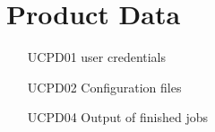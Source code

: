 \section{Product Data}
\begin{itemize}
  \item [UCPD01] user credentials
  \item [UCPD02] Configuration files
  \item [UCPD04] Output of finished jobs
\end{itemize}
